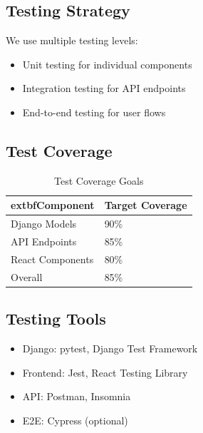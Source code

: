 \subsection{Testing Strategy}
We use multiple testing levels:
\begin{itemize}[leftmargin=*]
	\item Unit testing for individual components
	\item Integration testing for API endpoints
	\item End-to-end testing for user flows
\end{itemize}

\subsection{Test Coverage}
\begin{table}[H]
	\centering
	\begin{tabular}{|l|l|}
		\hline
			extbf{Component} & \textbf{Target Coverage} \\
		\hline
		Django Models & 90\% \\
		API Endpoints & 85\% \\
		React Components & 80\% \\
		Overall & 85\% \\
		\hline
	\end{tabular}
	\caption{Test Coverage Goals}
	\label{tab:coverage}
\end{table}

\subsection{Testing Tools}
\begin{itemize}[leftmargin=*]
	\item Django: pytest, Django Test Framework
	\item Frontend: Jest, React Testing Library
	\item API: Postman, Insomnia
	\item E2E: Cypress (optional)
\end{itemize}
